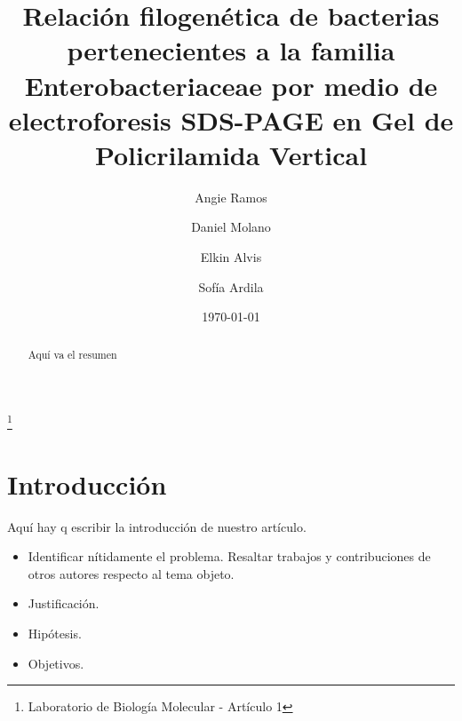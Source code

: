 \documentclass[%
 reprint,
 amsmath,amssymb,
 aps,
showkeys
]{revtex4-1}
\begin{document}

\title{Relación filogenética de bacterias pertenecientes a la familia Enterobacteriaceae por medio de electroforesis SDS-PAGE en Gel de Policrilamida Vertical}%
\thanks{Laboratorio de Biología Molecular - Artículo 1}%

\author{Angie Ramos}
\author{Daniel Molano}%
\author{Elkin Alvis}
\author{Sof\'ia Ardila}

%


\date[Fecha: ]{\today}%

\begin{abstract}
Aquí va el resumen
\end{abstract}

\maketitle


\section{\label{sec:Intro}Introducción}
	Aquí hay q escribir la introducción de nuestro artículo\citep{Alfonso2010a}. \\

	
	\begin{itemize}
		\item Identificar nítidamente el problema.
		\subitem Resaltar trabajos y contribuciones de otros autores respecto al tema objeto.
		\item Justificación.
		\item Hipótesis. 
		\item Objetivos.
	\end{itemize}
	
\end{document}
